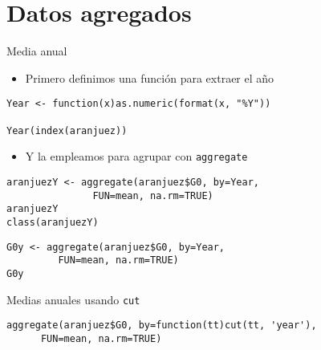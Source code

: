 \documentclass[xcolor={usenames,svgnames,dvipsnames}]{beamer}
\begin{document}
\section{Datos agregados}
\label{sec-3}
\begin{frame}[fragile,label=sec-3-1]{Media anual}
 \begin{itemize}
\item Primero definimos una función para extraer el año
\end{itemize}
\lstset{language=R,numbers=none}
\begin{lstlisting}
Year <- function(x)as.numeric(format(x, "%Y"))

Year(index(aranjuez))
\end{lstlisting}
\begin{itemize}
\item Y la empleamos para agrupar con \texttt{aggregate}
\end{itemize}
\lstset{language=R,numbers=none}
\begin{lstlisting}
aranjuezY <- aggregate(aranjuez$G0, by=Year,
		       FUN=mean, na.rm=TRUE)
aranjuezY
class(aranjuezY)
\end{lstlisting}

\lstset{language=R,numbers=none}
\begin{lstlisting}
G0y <- aggregate(aranjuez$G0, by=Year,
		 FUN=mean, na.rm=TRUE)
G0y
\end{lstlisting}
\end{frame}
\begin{frame}[fragile,label=sec-3-2]{Medias anuales usando \texttt{cut}}
 \lstset{language=R,numbers=none}
\begin{lstlisting}
aggregate(aranjuez$G0, by=function(tt)cut(tt, 'year'),
	  FUN=mean, na.rm=TRUE)
\end{lstlisting}
\end{frame}
\end{document}
